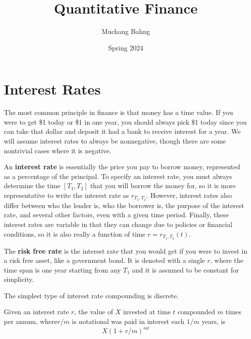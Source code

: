 \documentclass{article}
\begin{document}
\title{Quantitative Finance}
\author{Muchang Bahng}
\date{Spring 2024}

\maketitle
\tableofcontents
\pagebreak

\section{Interest Rates}

    The most common principle in finance is that money has a time value. If you were to get \$1 today or \$1 in one year, you should always pick \$1 today since you can take that dollar and deposit it had a bank to receive interest for a year. We will assume interest rates to always be nonnegative, though there are some nontrivial cases where it is negative. 

    \begin{definition}
      An \textbf{interest rate} is essentially the price you pay to borrow money, represented as a percentage of the principal. To specify an interest rate, you must always determine the time $[T_1, T_2]$ that you will borrow the money for, so it is more representative to write the interest rate as $r_{T_1, T_2}$. However, interest rates also differ between who the lender is, who the borrower is, the purpose of the interest rate, and several other factors, even with a given time period. Finally, these interest rates are variable in that they can change due to policies or financial conditions, so it is also really a function of time $r = r_{T_1, T_2} (t)$. 

      The \textbf{risk free rate} is the interest rate that you would get if you were to invest in a risk free asset, like a government bond. It is denoted with a single $r$, where the time span is one year starting from any $T_1$ and it is assumed to be constant for simplicity. 
    \end{definition}

    The simplest type of interest rate compounding is discrete. 

    \begin{definition}
      Given an interest rate $r$, the value of $X$ invested at time $t$ compounded $m$ times per annum, where$r/m$ is notational was paid in interest each $1/m$ years, is 
      \begin{equation}
        X (1 + r/m)^{mt}
      \end{equation}
    \end{definition}
    
\end{document}

